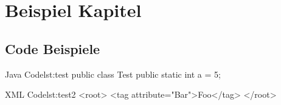 \chapter{Beispiel Kapitel}

\lipsum
\cite{internet}

\section{Code Beispiele}

\begin{java}{Java Code}{lst:test}
public class Test {
	public static int a = 5;
}
\end{java}

\begin{xml}{XML Code}{lst:test2}
<root>
	<tag attribute="Bar">Foo</tag>
</root>
\end{xml}

